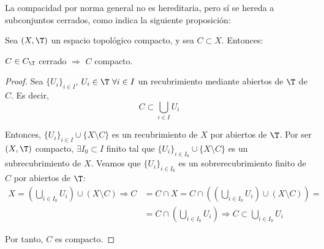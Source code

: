 La compacidad por norma general no es hereditaria, pero sí se hereda a subconjuntos cerrados, como indica la siguiente proposición:
\begin{prop}\label{prop:CerradoCompacto}
    Sea $(X,\T)$ un espacio topológico compacto, y sea $C\subset X$. Entonces:
    \begin{center}
        $C\in C_\T$ cerrado $\Longrightarrow$ $C$ compacto.
    \end{center}
\end{prop}
\begin{proof}
    Sea $\{U_i\}_{i\in I}$, $U_i\in \T~\forall i\in I$ un recubrimiento mediante abiertos de $\T$ de $C$. Es decir, $$C\subset \bigcup\limits_{i\in I}U_i$$

    Entonces, $\{U_i\}_{i\in I}\cup \{X\setminus C\}$ es un recubrimiento de $X$ por abiertos de $\T$. Por ser $(X,\T)$ compacto, $\exists I_0\subset I$ finito tal que
    $\{U_i\}_{i\in I_0}\cup \{X\setminus C\}$ es un subrecubrimiento de $X$. Veamos que $\{U_i\}_{i\in I_0}$ es un sobrerecubrimiento finito de $C$ por abiertos de $\T$:
    \begin{align*}
        X = \left(\bigcup_{i\in I_0}U_i\right) \cup (X\setminus C) \Longrightarrow
        C &= C\cap X = C\cap \left(\left(\bigcup_{i\in I_0}U_i\right) \cup (X\setminus C)\right) =\\
        &= C\cap \left(\bigcup_{i\in I_0}U_i \right)
        \Longrightarrow C \subset \bigcup_{i\in I_0}U_i
    \end{align*}

    Por tanto, $C$ es compacto.
\end{proof}

